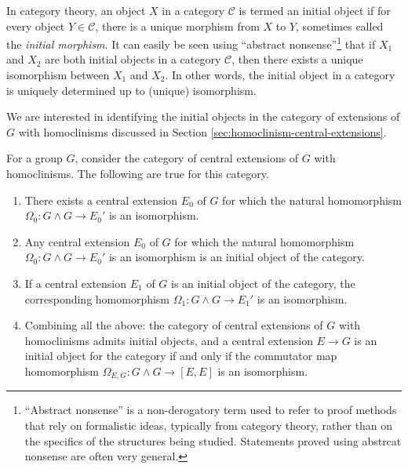 In category theory, an object $X$ in a category $\mathcal{C}$ is
termed an initial object if for every object $Y \in \mathcal{C}$,
there is a unique morphism from $X$ to $Y$, sometimes called the {\em
  initial morphism}. It can easily be seen using ``abstract
nonsense''\footnote{``Abstract nonsense'' is a non-derogatory term
  used to refer to proof methods that rely on formalistic ideas,
  typically from category theory, rather than on the specifics of the
  structures being studied. Statements proved using abstrcat nonsense
  are often very general.} that if $X_1$ and $X_2$ are both initial
  objects in a category $\mathcal{C}$, then there exists a unique
  isomorphism between $X_1$ and $X_2$. In other words, the initial
  object in a category is uniquely determined up to (unique)
  isomorphism.

We are interested in identifying the initial objects in the category
of extensions of $G$ with homoclinisms discussed in Section
\ref{sec:homoclinism-central-extensions}.

\begin{lemma}\label{lemma:initobj}
  For a group $G$, consider the category of central extensions of $G$
  with homoclinisms. The following are true for this category.
  \begin{enumerate}
  \item There exists a central extension $E_0$ of $G$ for which the
    natural homomorphism $\Omega_0: G \wedge G \to E_0'$ is an isomorphism.
  \item Any central extension $E_0$ of $G$ for which the natural
    homomorphism $\Omega_0:G \wedge G \to E_0'$ is an isomorphism is
    an initial object of the category.
  \item If a central extension $E_1$ of $G$ is an initial object of
    the category, the corresponding homomorphism $\Omega_1:G \wedge G
    \to E_1'$ is an isomorphism.
  \item Combining all the above: the category of central extensions of
    $G$ with homoclinisms admits initial objects, and a central
    extension $E \to G$ is an initial object for the category if and
    only if the commutator map homomorphism $\Omega_{E,G}: G \wedge G
    \to [E,E]$ is an isomorphism.
  \end{enumerate}
\end{lemma}

